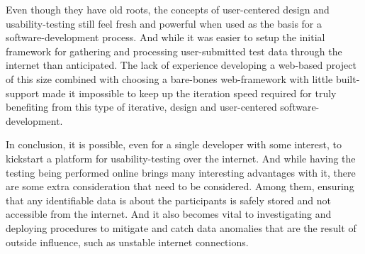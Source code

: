 Even though they have old roots, the concepts of user-centered design and
usability-testing still feel fresh and powerful when used as the basis
for a software-development process. And while it was easier to setup the
initial framework for gathering and processing user-submitted test data through
the internet than anticipated. The lack of experience developing a web-based
project of this size combined with choosing a bare-bones web-framework with
little built-support made it impossible to keep up the iteration speed required
for truly benefiting from this type of iterative, design and user-centered
software-development.

In conclusion, it is possible, even for a single developer with some interest,
to kickstart a platform for usability-testing over the internet. And while
having the testing being performed online brings many interesting advantages
with it, there are some extra consideration that need to be considered. Among
them, ensuring that any identifiable data is about the participants is safely
stored and not accessible from the internet. And it also becomes vital to
investigating and deploying procedures to mitigate and catch data
anomalies that are the result of outside influence, such as unstable
internet connections.
